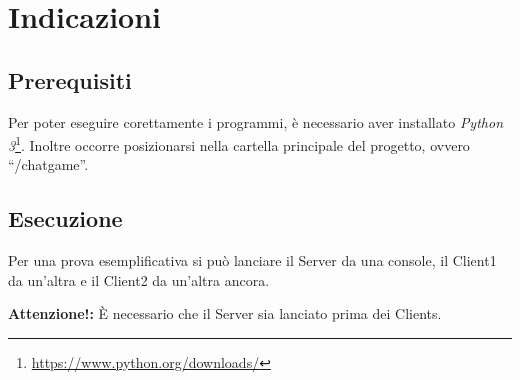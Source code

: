 \documentclass[a4paper,12pt]{report}
\begin{document}
\section{Indicazioni}

\subsection{Prerequisiti}
Per poter eseguire corettamente i programmi, è necessario aver installato \textit{Python 3}\footnote{\url{https://www.python.org/downloads/}}.
Inoltre occorre posizionarsi nella cartella principale del progetto, ovvero ``/chatgame''.

\subsection{Esecuzione}
Per una prova esemplificativa si può lanciare il Server da una console, il Client1 da un'altra e il Client2
da un'altra ancora.

\textbf{Attenzione!:} È necessario che il Server sia lanciato prima dei Clients.
\end{document}
